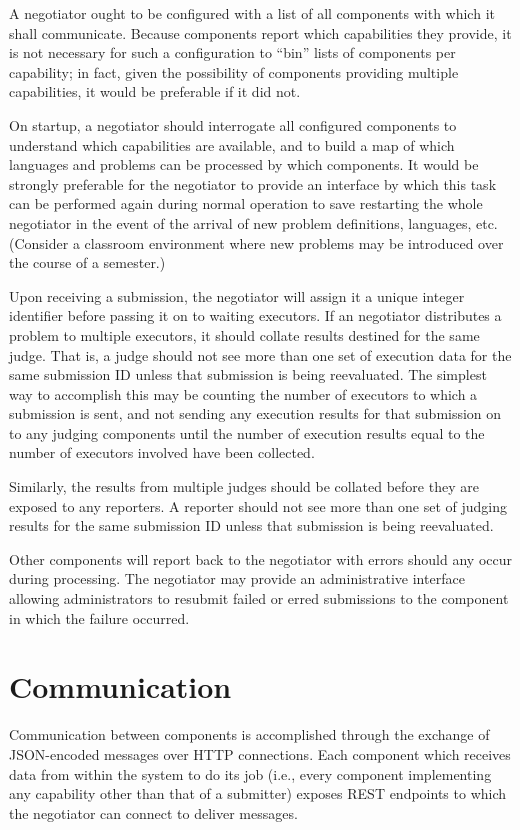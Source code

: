\documentclass[11pt,letterpaper]{article}
\begin{document}
A negotiator ought to be configured with a list of all components with which it
shall communicate. Because components report which capabilities they provide,
it is not necessary for such a configuration to ``bin'' lists of components per
capability; in fact, given the possibility of components providing multiple
capabilities, it would be preferable if it did not.

On startup, a negotiator should interrogate all configured components to
understand which capabilities are available, and to build a map of which
languages and problems can be processed by which components. It would be
strongly preferable for the negotiator to provide an interface by which this
task can be performed again during normal operation to save restarting the
whole negotiator in the event of the arrival of new problem definitions,
languages, etc. (Consider a classroom environment where new problems may be
introduced over the course of a semester.)

Upon receiving a submission, the negotiator will assign it a unique integer
identifier before passing it on to waiting executors. If an negotiator
distributes a problem to multiple executors, it should collate results destined
for the same judge. That is, a judge should not see more than one set of
execution data for the same submission ID unless that submission is being
reevaluated. The simplest way to accomplish this may be counting the number of
executors to which a submission is sent, and not sending any execution results
for that submission on to any judging components until the number of execution
results equal to the number of executors involved have been collected.

Similarly, the results from multiple judges should be collated before they are
exposed to any reporters. A reporter should not see more than one set of
judging results for the same submission ID unless that submission is being
reevaluated.

Other components will report back to the negotiator with errors should any
occur during processing. The negotiator may provide an administrative interface
allowing administrators to resubmit failed or erred submissions to the
component in which the failure occurred.

\section{Communication}
\label{comm}

Communication between components is accomplished through the exchange of
JSON-encoded messages over HTTP connections. Each component which receives data
from within the system to do its job (i.e., every component implementing any
capability other than that of a submitter) exposes REST endpoints to which the
negotiator can connect to deliver messages.
\end{document}
